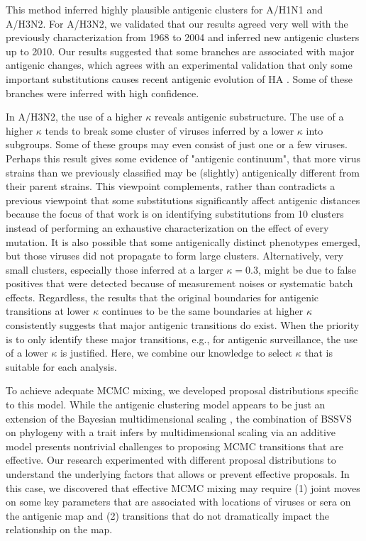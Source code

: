 \documentclass[11pt,oneside,letterpaper]{article}
\begin{document}
This method inferred highly plausible antigenic clusters for A/H1N1 and A/H3N2. 
For  A/H3N2, we validated that our results agreed very well with the previously characterization from 1968 to 2004 \cite{smith_mapping_2004} and inferred new antigenic clusters up to 2010. 
Our results suggested that some branches are associated with major antigenic changes, which agrees with an experimental validation that only some important substitutions causes recent antigenic evolution of HA \cite{koel_substitutions_2013}. 
Some of these branches were inferred with high confidence. 


In A/H3N2, the use of a higher $\kappa$ reveals antigenic substructure. 
The use of a higher $\kappa$ tends to break some cluster of viruses inferred by a lower $\kappa$ into subgroups. 
Some of these groups may even consist of just one or a few viruses. 
Perhaps this result gives some evidence of "antigenic continuum", that more virus strains than we previously classified may be (slightly) antigenically different from their parent strains. 
This viewpoint complements, rather than contradicts a previous viewpoint that some substitutions significantly affect antigenic distances \cite{koel_substitutions_2013} because the focus of that work is on identifying substitutions from 10 clusters instead of performing an exhaustive characterization on the effect of every mutation. 
It is also possible that some antigenically distinct phenotypes emerged, but those viruses did not propagate to form large clusters.
Alternatively, very small clusters, especially those inferred at a larger $\kappa=0.3$, might be due to false positives that were detected because of measurement noises or systematic batch effects.
Regardless, the results that the original boundaries for antigenic transitions at lower $\kappa$ continues to be the same boundaries at higher $\kappa$ consistently suggests that major antigenic transitions do exist. 
When the priority is to only identify these major transitions, e.g., for antigenic surveillance, the use of a lower $\kappa$ is justified.  
Here, we combine our knowledge to select $\kappa$ that is suitable for each analysis.


To achieve adequate MCMC mixing, we developed proposal distributions specific to this model. 
While the antigenic clustering model appears to be just an extension of the Bayesian multidimensional scaling \cite{bedford_integrating_2014}, the combination of BSSVS on phylogeny with a trait infers by multidimensional scaling via an additive model presents nontrivial challenges to proposing MCMC transitions that are effective. 
Our research experimented with different proposal distributions to understand the underlying factors that allows or prevent effective proposals. 
In this case, we discovered that effective MCMC mixing may require (1) joint moves on some key parameters that are associated with locations of viruses or sera on the antigenic map and (2) transitions that do not dramatically impact the relationship on the map.
\end{document}
